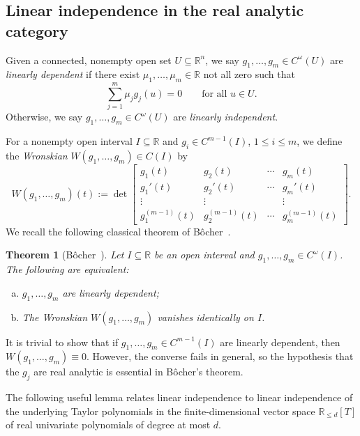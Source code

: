 \documentclass[reqno]{amsart}
\numberwithin{equation}{section}
\newcommand{\R}{\mathbb{R}}
\theoremstyle{plain}
\newtheorem{theorem}{Theorem}[section]
\theoremstyle{definition}
\begin{document}
\subsection{Linear independence in the real analytic category}%
Given a connected, nonempty open set $U \subseteq \R^n$, we say $g_1, \dots, g_m \in C^{\omega}(U)$ are \textit{linearly dependent} if there exist $\mu_1, \dots, \mu_m \in \R$ not all zero such that
\begin{equation*}
\sum_{j=1}^m \mu_j g_j(u) = 0 \qquad \textrm{for all $u \in U$.}
\end{equation*}
Otherwise, we say $g_1, \dots, g_m \in C^{\omega}(U)$ are \textit{linearly independent}. 

For a nonempty open interval $I \subseteq \R$ and $g_i \in C^{m-1}(I)$, $1 \leq i \leq m$, we define the \textit{Wronskian} $W(g_1, \ldots, g_m) \in C(I)$ by
\begin{equation*}
    W(g_1, \ldots, g_m) (t) :=
\det 
\begin{bmatrix}
g_1(t) & g_2(t) & \cdots & g_m(t) \\
g_1'(t) & g_2'(t) & \cdots & g_m' (t)\\
\vdots & \vdots &  & \vdots \\
g_1^{(m-1)}(t)& g_2^{(m-1)}(t) & \cdots & g_m^{(m-1)}(t)
\end{bmatrix}.
\end{equation*}
We recall the following classical theorem of B\^ocher~\cite{Bocher1900}.


\begin{theorem}[B\^ocher~\cite{Bocher1900}]\label{thm: Bocher} Let $I \subseteq \R$ be an open interval and $g_1, \dots, g_m \in C^{\omega}(I)$. The following are equivalent:
\begin{enumerate}[a)]
    \item $g_1, \dots, g_m$ are linearly dependent;
    \item The Wronskian $W(g_1, \dots, g_m)$ vanishes identically on $I$.
\end{enumerate}
\end{theorem}

It is trivial to show that if $g_1, \dots, g_m \in C^{m-1}(I)$ are linearly dependent, then $W(g_1, \dots, g_m) \equiv 0$. However, the converse fails in general, so the hypothesis that the $g_j$ are real analytic is essential in B\^ocher's theorem.

The following useful lemma relates linear independence to linear independence of the underlying Taylor polynomials in the finite-dimensional vector space $\R_{\leq d}[T]$ of real univariate polynomials of degree at most $d$. 
\end{document}
